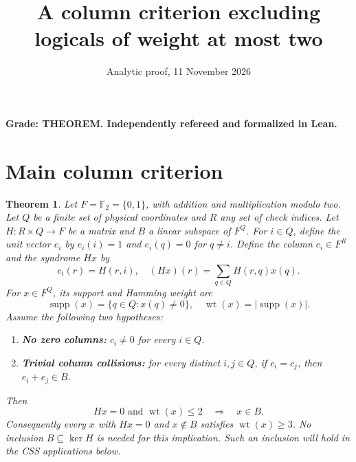 \documentclass{article}
\title{A column criterion excluding logicals of weight at most two}
\author{}
\date{Analytic proof, 11 November 2026}
\newtheorem{theorem}{Theorem}
\DeclareMathOperator{\wt}{wt}
\DeclareMathOperator{\supp}{supp}
\begin{document}
\maketitle

\textbf{Grade: THEOREM. Independently refereed and formalized in Lean.}

\section{Main column criterion}\label{sec:criterion}

\begin{theorem}\label{thm:criterion}
Let \(F = \mathbb{F}_2 = \{0, 1\}\), with addition and multiplication modulo two. Let \(Q\)
be a finite set of physical coordinates and \(R\) any set of check indices. Let
\(H \colon R \times Q \to F\) be a matrix and \(B\) a linear subspace of \(F^Q\). For
\(i \in Q\), define the unit vector \(e_i\) by \(e_i(i) = 1\) and \(e_i(q) = 0\) for
\(q \ne i\). Define the column \(c_i \in F^R\) and the syndrome \(Hx\) by
\begin{equation}
  c_i(r) = H(r, i), \quad (Hx)(r) = \sum_{q \in Q} H(r, q) x(q).
\end{equation}
For \(x \in F^Q\), its support and Hamming weight are
\begin{equation}
  \supp(x) = \{q \in Q : x(q) \ne 0\}, \quad \wt(x) = \lvert\supp(x)\rvert.
\end{equation}
Assume the following two hypotheses:
\begin{enumerate}
  \item \textbf{No zero columns:} \(c_i \ne 0\) for every \(i \in Q\).
  \item \textbf{Trivial column collisions:} for every distinct \(i, j \in Q\), if
    \(c_i = c_j\), then \(e_i + e_j \in B\).
\end{enumerate}
Then
\begin{equation}
  Hx = 0 \text{ and } \wt(x) \le 2 \quad \Longrightarrow \quad x \in B.
\end{equation}
Consequently every \(x\) with \(Hx = 0\) and \(x \notin B\) satisfies \(\wt(x) \ge 3\). No
inclusion \(B \subseteq \ker H\) is needed for this implication. Such an inclusion will
hold in the CSS applications below.
\end{theorem}
\end{document}

